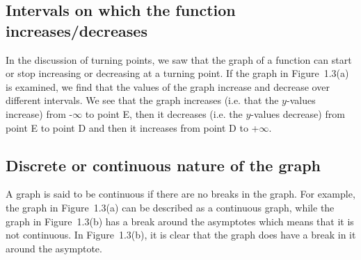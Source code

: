 \subsection*{ Intervals on which the function increases/decreases}
\nopagebreak
\label{m39337*id236961}In the discussion of turning points, we saw that the graph of a function can start or stop increasing or decreasing at a turning point. If the graph in Figure~1.3(a) is examined, we find that the values of the graph increase and decrease over different intervals. We see that the graph increases (i.e. that the $y$-values increase) from -$\infty $ to point E, then it decreases (i.e. the $y$-values decrease) from point E to point D and then it increases from point D to +$\infty $.\par 
\label{m39337*uid53}
\subsection*{ Discrete or continuous nature of the graph}
\nopagebreak
\label{m39337*id237022}A graph is said to be continuous if there are no breaks in the graph. For example, the graph in Figure~1.3(a) can be described as a continuous graph, while the graph in Figure~1.3(b) has a break around the asymptotes which means that it is not continuous.
In Figure~1.3(b), it is clear that the graph does have a break in it around the asymptote.\par 
\label{m39337*secfhsst!!!underscore!!!id796}
